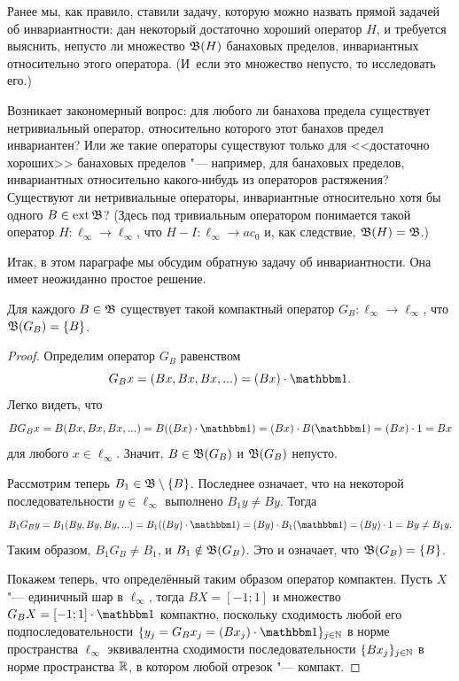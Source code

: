 \label{par:reverse_invariance}

Ранее мы, как правило, ставили задачу, которую можно назвать прямой задачей об инвариантности:
дан некоторый достаточно хороший оператор $H$, и требуется выяснить, непусто ли множество $\mathfrak{B}(H)$
банаховых пределов, инвариантных относительно этого оператора.
(И~если это множество непусто, то исследовать его.)

Возникает закономерный вопрос: для любого ли банахова предела существует нетривиальный оператор,
относительно которого этот банахов предел инвариантен?
Или же такие операторы существуют только для <<достаточно хороших>>
банаховых пределов "--- например, для банаховых пределов, инвариантных относительно какого-нибудь из операторов растяжения?
Существуют ли нетривиальные операторы, инвариантные относительно хотя бы одного $B\in\operatorname{ext} \mathfrak{B}$?
(Здесь под тривиальным оператором понимается такой оператор
$H:\ell_\infty \to \ell_\infty$, что $H-I:\ell_\infty \to ac_0$ и,
как следствие, $\mathfrak{B}(H) = \mathfrak{B}$.)

Итак, в этом параграфе мы обсудим обратную задачу об инвариантности.
Она имеет неожиданно простое решение.

\begin{theorem}
	\label{thm:generated_operator_G_B}
	Для каждого $B\in \mathfrak{B}$ существует такой компактный оператор $G_B:\ell_\infty \to \ell_\infty$,
	что $\mathfrak{B}(G_B) = \{B\}$.
\end{theorem}

\begin{proof}
	Определим оператор $G_B$ равенством
	\begin{equation}
		G_B x = (Bx, Bx, Bx, ...) = (Bx)\cdot\one
		.
	\end{equation}
	Легко видеть, что
	\begin{equation}
		B G_B x = B(Bx, Bx, Bx, ...) = B((Bx)\cdot\one) = (Bx)\cdot B(\one)= (Bx)\cdot 1 = Bx
	\end{equation}
	для любого $x\in\ell_\infty$.
	Значит, $B\in \mathfrak{B} (G_B)$ и $\mathfrak{B} (G_B)$ непусто.

	Рассмотрим теперь $B_1 \in \mathfrak{B} \setminus\{B\}$.
	Последнее означает, что на некоторой последовательности $y\in\ell_\infty$ выполнено $B_1y \ne By$.
	Тогда
	\begin{equation}
		B_1 G_B y = B_1(By, By, By, ...) = B_1((By)\cdot\one) = (By)\cdot B_1(\one)= (By)\cdot 1 = By \ne B_1y
		.
	\end{equation}
	Таким образом, $B_1 G_B \ne B_1$, и $B_1 \notin \mathfrak{B} (G_B)$.
	Это и означает, что $\mathfrak{B}(G_B) = \{B\}$.

	Покажем теперь, что определённый таким образом оператор компактен.
	Пусть $X$ "--- единичный шар в $\ell_\infty$,
	тогда $BX = [-1;1]$
	и множество $G_B X = [-1;1] \cdot \one$
	компактно,
	поскольку сходимость любой его подпоследовательности $\{y_j = G_B x_j = (Bx_j) \cdot \one\}_{j\in\N}$
	в норме пространства $\ell_\infty$ эквивалентна сходимости последовательности
	$\{Bx_j\}_{j\in\mathbb{N}}$ в норме пространства $\mathbb{R}$,
	в котором любой отрезок "--- компакт.
\end{proof}

